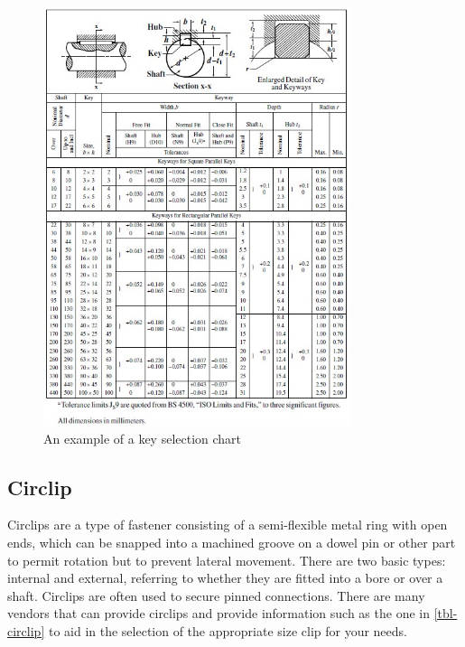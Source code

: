 \begin{figure}[h!]
    \centering
    \includegraphics[width=0.8\textwidth]{09_fixtures_and_fittings/key-selection.jpg}
    \caption{An example of a key selection chart}
\end{figure}

\subsection{Circlip}

Circlips are a type of fastener consisting of a semi-flexible metal ring with open ends, which can be snapped into a machined groove on a dowel pin or other part to permit rotation but to prevent lateral movement. 
There are two basic types: internal and external, referring to whether they are fitted into a bore or over a shaft.
Circlips are often used to secure pinned connections.
There are many vendors that can provide circlips and provide information such as the one in \cref{tbl-circlip} to aid in the selection of the appropriate size clip for your needs.

